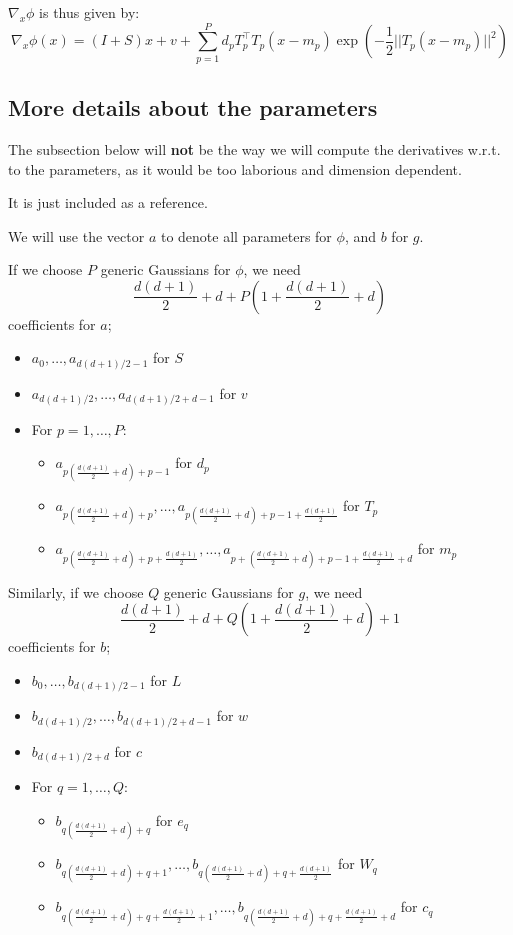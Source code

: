 \documentclass{article}
\theoremstyle{definition}
\theoremstyle{remark}
\newcommand{\1}{\mathbbm{1}}
\begin{document}
$\nabla_x \phi$ is thus given by:
\[
\nabla_x \phi(x) = (I+S) x + v + \sum_{p=1}^P d_p T_p^{\top} T_p (x - m_p) \exp \left( -\frac{1}{2} ||T_p (x - m_p)||^2 \right)  
\]

\subsection{More details about the parameters}
The subsection below will \textbf{not} be the way we will compute the derivatives w.r.t. to the parameters, as it would be too laborious and dimension dependent.

It is just included as a reference.

We will use the vector $a$ to denote all parameters for $\phi$, and $b$ for $g$.

%
If we choose $P$ generic Gaussians for $\phi$, we need 
\[
\frac{d(d+1)}{2} + d + P\left(1+\frac{d(d+1)}{2} + d\right) 
\]
coefficients for $a$;
\begin{itemize}
\item $a_0,\ldots, a_{d(d+1)/2-1}$ for $S$
\item $a_{d(d+1)/2}, \ldots, a_{d(d+1)/2 + d -1}$ for $v$
\item For $p=1,\ldots,P$:
\begin{itemize}
\item $a_{p(\frac{d(d+1)}{2} + d) + p-1}$ for $d_p$
\item $a_{p(\frac{d(d+1)}{2} + d) + p}, \ldots, a_{p(\frac{d(d+1)}{2} + d) + p-1 + \frac{d(d+1)}{2}}$ for $T_p$
\item $a_{p(\frac{d(d+1)}{2} + d) + p + \frac{d(d+1)}{2}}, \ldots, a_{p+(\frac{d(d+1)}{2} + d) + p-1 + \frac{d(d+1)}{2} + d}$ for $m_p$
\end{itemize}
\end{itemize}
Similarly, if we choose $Q$ generic Gaussians for $g$, we need
\[
\frac{d(d+1)}{2} + d + Q\left(1+\frac{d(d+1)}{2} + d\right)  + 1
\]
coefficients for $b$;
\begin{itemize}
\item $b_0,\ldots, b_{d(d+1)/2-1}$ for $L$
\item $b_{d(d+1)/2}, \ldots, b_{d(d+1)/2 + d -1}$ for $w$
\item $b_{d(d+1)/2 + d}$ for $c$
\item For $q=1,\ldots,Q$:
\begin{itemize}
\item $b_{q(\frac{d(d+1)}{2} + d) + q}$ for $e_q$
\item $b_{q(\frac{d(d+1)}{2} + d) + q + 1}, \ldots, b_{q(\frac{d(d+1)}{2} + d) + q + \frac{d(d+1)}{2}}$ for $W_q$
\item $b_{q(\frac{d(d+1)}{2} + d) + q + \frac{d(d+1)}{2} + 1}, \ldots, b_{q(\frac{d(d+1)}{2} + d) + q + \frac{d(d+1)}{2} + d}$ for $c_q$
\end{itemize}
\end{itemize}
\end{document}
